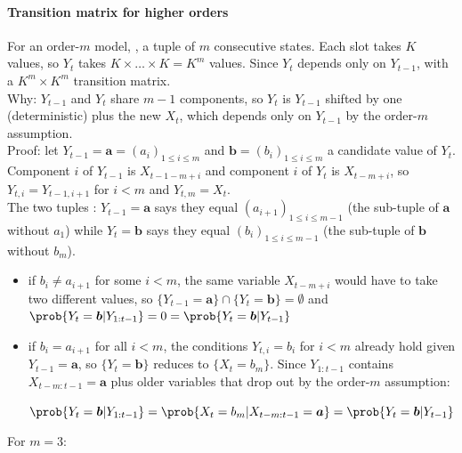 \paragraph{Transition matrix for higher orders}
For an order-$m$ model, , a tuple of $m$
consecutive states. Each slot takes $K$ values, so $Y_{t}$ takes $K\times\dots\times K=K^{m}$ values.
Since $Y_{t}$ depends only on $Y_{t-1}$,  with a
$K^{m}\times K^{m}$ transition matrix.\\
Why: $Y_{t-1}$ and $Y_{t}$ share $m-1$ components, so $Y_{t}$ is $Y_{t-1}$ shifted by one
(deterministic) plus the new $X_{t}$, which depends only on $Y_{t-1}$ by the order-$m$ assumption.\\
Proof: let $Y_{t-1}=\bm{a}=\left(a_{i}\right)_{1\leq i\leq m}$ and
$\bm{b}=\left(b_{i}\right)_{1\leq i\leq m}$ a candidate value of $Y_{t}$. Component $i$ of $Y_{t-1}$ is
$X_{t-1-m+i}$ and component $i$ of $Y_{t}$ is $X_{t-m+i}$, so $Y_{t,i}=Y_{t-1,i+1}$ for $i<m$ and
$Y_{t,m}=X_{t}$.\\
The two tuples : $Y_{t-1}=\bm{a}$ says they equal
$\left(a_{i+1}\right)_{1\leq i\leq m-1}$ (the sub-tuple of $\bm{a}$ without $a_{1}$) while
$Y_{t}=\bm{b}$ says they equal $\left(b_{i}\right)_{1\leq i\leq m-1}$ (the sub-tuple of $\bm{b}$
without $b_{m}$).
\begin{itemize}
    \item if $b_{i}\neq a_{i+1}$ for some $i<m$, the same variable $X_{t-m+i}$ would have to take two
        different values, so $\{Y_{t-1}=\bm{a}\}\cap\{Y_{t}=\bm{b}\}=\emptyset$ and
        $\prob{Y_{t}=\bm{b}|Y_{1:t-1}}=0=\prob{Y_{t}=\bm{b}|Y_{t-1}}$
    \item if $b_{i}=a_{i+1}$ for all $i<m$, the conditions $Y_{t,i}=b_{i}$ for $i<m$ already hold
        given $Y_{t-1}=\bm{a}$, so $\{Y_{t}=\bm{b}\}$ reduces to $\{X_{t}=b_{m}\}$. Since $Y_{1:t-1}$
        contains $X_{t-m:t-1}=\bm{a}$ plus older variables that drop out by the order-$m$ assumption:
        \begin{center}
            $\prob{Y_{t}=\bm{b}|Y_{1:t-1}}=\prob{X_{t}=b_{m}|X_{t-m:t-1}=\bm{a}}=
            \prob{Y_{t}=\bm{b}|Y_{t-1}}$
        \end{center}
\end{itemize}
For $m=3$:
\begin{center}
\end{center}
